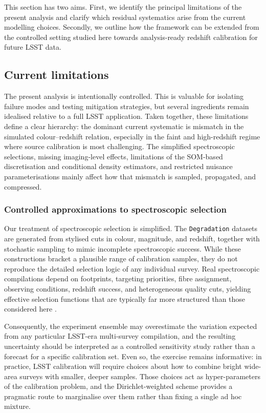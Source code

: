 This section has two aims. First, we identify the principal limitations of the present analysis and clarify which residual systematics arise from the current modelling choices. Secondly, we outline how the framework can be extended from the controlled setting studied here towards analysis-ready redshift calibration for future LSST data.

\subsection{Current limitations} \label{sec:6.1}

The present analysis is intentionally controlled. This is valuable for isolating failure modes and testing mitigation strategies, but several ingredients remain idealised relative to a full LSST application. Taken together, these limitations define a clear hierarchy: the dominant current systematic is mismatch in the simulated colour--redshift relation, especially in the faint and high-redshift regime where source calibration is most challenging. The simplified spectroscopic selections, missing imaging-level effects, limitations of the SOM-based discretisation and conditional density estimators, and restricted nuisance parameterisations mainly affect how that mismatch is sampled, propagated, and compressed. 

\subsubsection{Controlled approximations to spectroscopic selection} \label{sec:6.1.1}

Our treatment of spectroscopic selection is simplified. The \texttt{Degradation} datasets are generated from stylised cuts in colour, magnitude, and redshift, together with stochastic sampling to mimic incomplete spectroscopic success. While these constructions bracket a plausible range of calibration samples, they do not reproduce the detailed selection logic of any individual survey. Real spectroscopic compilations depend on footprints, targeting priorities, fibre assignment, observing conditions, redshift success, and heterogeneous quality cuts, yielding effective selection functions that are typically far more structured than those considered here \citep{2016arXiv161100036D}.

Consequently, the experiment ensemble may overestimate the variation expected from any particular LSST-era multi-survey compilation, and the resulting uncertainty should be interpreted as a controlled sensitivity study rather than a forecast for a specific calibration set. Even so, the exercise remains informative: in practice, LSST calibration will require choices about how to combine bright wide-area surveys with smaller, deeper samples. Those choices act as hyper-parameters of the calibration problem, and the Dirichlet-weighted scheme provides a pragmatic route to marginalise over them rather than fixing a single ad hoc mixture.

